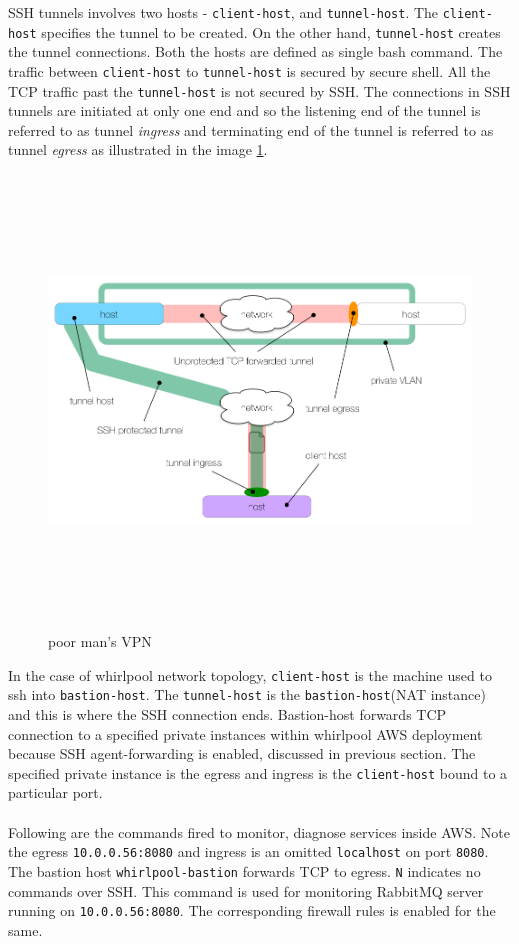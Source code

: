 \noindent
SSH tunnels involves two hosts - \texttt{client-host}, and \texttt{tunnel-host}. The \texttt{client-host} specifies
the tunnel to be created. On the other hand, \texttt{tunnel-host} creates the tunnel connections. Both the hosts are defined as single bash command. The traffic between \texttt{client-host} to \texttt{tunnel-host} is secured by secure shell. All the  TCP traffic past the \texttt{tunnel-host} is not secured by SSH. The connections in SSH tunnels are initiated at only one end and so the listening end of the tunnel is referred to as tunnel \emph{ingress} and terminating end of the tunnel is referred to as tunnel \emph{egress} as 
illustrated in the image \ref{fig:poormanvpn}.

\begin{figure}[h!]
  \centering
  \includegraphics[width=15cm,height=12cm,keepaspectratio]{../media/crawler/ssh-tunnel-host-access.png}
  \caption{poor man's VPN \cite{tunnels}}
  \label{fig:poormanvpn}
\end{figure}

\pagebreak

\noindent
In the case of whirlpool network topology, \texttt{client-host} is the machine used to ssh into \texttt{bastion-host}. The \texttt{tunnel-host} is the \texttt{bastion-host}(NAT instance) and this is where the SSH connection ends. Bastion-host forwards TCP connection to a specified private instances within whirlpool AWS deployment because SSH agent-forwarding is enabled, discussed in previous section. The specified private instance is the egress and ingress is the \texttt{client-host} bound to a particular port.
\\
\\
\noindent
Following are the commands fired to monitor, diagnose services inside AWS. Note the egress 
\texttt{10.0.0.56:8080} and ingress is an omitted \texttt{localhost} on port \texttt{8080}.
The bastion host \texttt{whirlpool-bastion} forwards TCP to egress. \texttt{N} indicates no commands over SSH. This command is used for monitoring RabbitMQ server running on \texttt{10.0.0.56:8080}. The corresponding firewall rules is enabled for the same.


